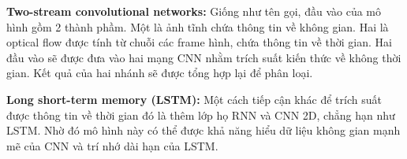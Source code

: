 \textbf{Two-stream convolutional networks:} Giống như tên gọi, đầu vào của mô hình gồm 2 thành phầm. Một là ảnh tĩnh chứa thông tin về không gian. Hai là optical flow được tính từ chuỗi các frame hình, chứa thông tin về thời gian. Hai đầu vào sẽ được đưa vào hai mạng CNN nhằm trích suất kiến thức về không thời gian. Kết quả của hai nhánh sẽ được tổng hợp lại để phân loại.

\textbf{Long short-term memory (LSTM):} Một cách tiếp cận khác để trích suất được thông tin về thời gian đó là thêm lớp họ RNN và CNN 2D, chẳng hạn như LSTM. Nhờ đó mô hình này có thể được khả năng hiểu dữ liệu không gian mạnh mẽ của CNN và trí nhớ dài hạn của LSTM.